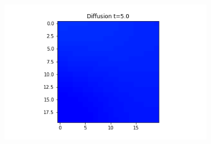 \documentclass[10pt,a4paper]{article}
\begin{document}
\begin{figure}[!h]
\begin{subfigure}[b]{0.25\textwidth}
	\end{subfigure}~
	\begin{subfigure}[b]{0.25\textwidth}
		\includegraphics[width= \textwidth]{images/grid-t5-x01.png}
	\end{subfigure}
\end{figure}
\end{document}
